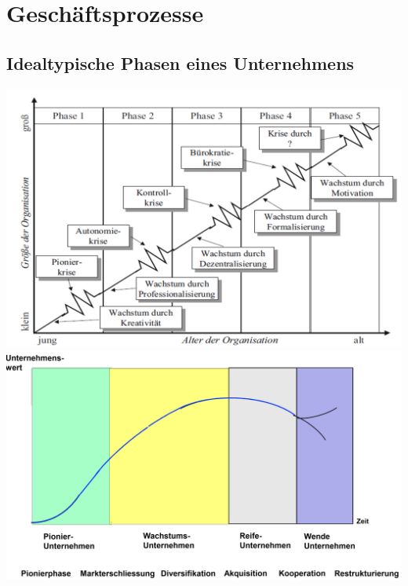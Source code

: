 \section{Geschäftsprozesse}
\subsection{Idealtypische Phasen eines Unternehmens}
\begin{multicols}{2}
	\includegraphics[width=1\linewidth]{images/phasen}
	\includegraphics[width=1\linewidth]{images/phasen_2}
\end{multicols}

